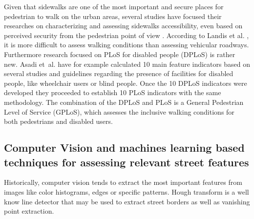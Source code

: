 \documentclass[10pt,conference,a4paper]{IEEEtran}
\begin{document}
Given that sidewalks are one of the most important and secure places for pedestrian to walk on the urban areas, several studies have focused their researches on characterizing and assessing sidewalks accessibility, even based on perceived security from the pedestrian point of view \cite{tan_research_2007}. According to Landis et al. \cite{landis_modeling_2001}, it is more difficult to assess walking conditions than assessing vehicular roadways.  Furthermore research focused on PLoS for disabled people (DPLoS) is rather new. Asadi et~al. \cite{asadi-shekari_zohreh_disabled_2013} have for example calculated 10 main feature indicators based on several studies and guidelines regarding the presence of facilities for disabled people, like wheelchair users or blind people. Once the 10 DPLoS indicators were developed they proceeded to establish 10 PLoS indicators with the same methodology.  The combination of the DPLoS and PLoS is a General Pedestrian Level of Service (GPLoS), which assesses the inclusive walking conditions for both pedestrians and disabled users.
 
\subsection{Computer Vision and machines learning based techniques for assessing relevant street features}
Historically, computer vision tends to extract the most important features from images like color histograms, edges \cite{canny_computational_1986} or specific patterns. %
Hough transform is a well know line detector that may be used to extract street borders %
\cite{kiryati_probabilistic_1991} 
as well as vanishing point extraction. %
\end{document}
